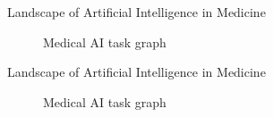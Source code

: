 \documentclass[pdf]{beamer}
\newcommand{\?}{\ensuremath{^\texttt{\bf [CITATION~NEEDED]}}}
\begin{document}
\begin{frame}{Landscape of Artificial Intelligence in Medicine}

\begin{figure}
\centering
{}
\caption{Medical AI task graph}
\label{fig_task_graph}
\end{figure}

\end{frame}

\begin{frame}{Landscape of Artificial Intelligence in Medicine}

\begin{figure}
\centering
{}
\caption{Medical AI task graph}
\label{fig_task_graph_point}
\end{figure}

\end{frame}
\end{document}
